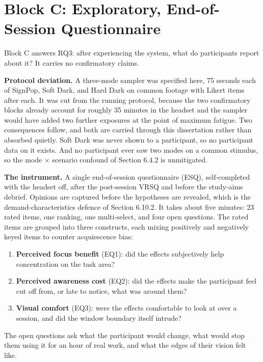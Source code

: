 \section{Block C: Exploratory, End-of-Session Questionnaire}

Block C answers RQ3: after experiencing the system, what do participants report about it? It carries
no confirmatory claims.

\textbf{Protocol deviation.} A three-mode sampler was specified here, 75 seconds each of SignPop, Soft
Dark, and Hard Dark on common footage with Likert items after each. It was cut from the running
protocol, because the two confirmatory blocks already account for roughly 35 minutes in the headset
and the sampler would have added two further exposures at the point of maximum fatigue. Two
consequences follow, and both are carried through this dissertation rather than absorbed quietly.
Soft Dark was never shown to a participant, so no participant data on it exists. And no participant
ever saw two modes on a common stimulus, so the mode $\times$ scenario confound of Section 6.4.2 is
unmitigated.

\textbf{The instrument.} A single end-of-session questionnaire (ESQ), self-completed
with the headset off, after the post-session VRSQ and before the study-aims debrief. Opinions are
captured before the hypotheses are revealed, which is the demand-characteristics defence of
Section 6.10.2. It takes about five minutes: 23 rated items, one ranking, one multi-select, and four
open questions. The rated items are grouped into three constructs, each mixing positively and
negatively keyed items to counter acquiescence bias:

\begin{enumerate}
\item \textbf{Perceived focus benefit} (EQ1): did the effects subjectively help concentration on the
  task area?
\item \textbf{Perceived awareness cost} (EQ2): did the effects make the participant feel cut off
  from, or late to notice, what was around them?
\item \textbf{Visual comfort} (EQ3): were the effects comfortable to look at over a session, and did
  the window boundary itself intrude?
\end{enumerate}

The open questions ask what the participant would change, what would stop them using it for an hour
of real work, and what the edges of their vision felt like.

